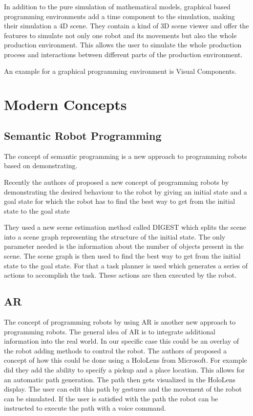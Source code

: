 \documentclass[conference]{IEEEtran}
\begin{document}

        In addition to the pure simulation of mathematical models, graphical based programming environments add a time component to the simulation, making their simulation a 4D scene.
        They contain a kind of 3D scene viewer and offer the features to simulate not only one robot and its movements but also the whole production environment. This allows the user to simulate the whole production process and interactions between different parts of the production environment. %

        An example for a graphical programming environment is Visual Components. %

\section{Modern Concepts}

    \subsection{Semantic Robot Programming}

        The concept of semantic programming is a new approach to programming robots based on demonstrating.

        Recently the authors of \cite{p1} proposed a new concept of programming robots by demonstrating the desired behaviour to the robot by giving an initial state and a goal state for which the robot has to find the best way to get from the initial state to the goal state

        They used a new scene estimation method called DIGEST which splits the scene into a scene graph representing the structure of the initial state. The only parameter needed is the information about the number of objects present in the scene. The scene graph is then used to find the best way to get from the initial state to the goal state.
        For that a task planner is used which generates a series of actions to accomplish the task. These actions are then executed by the robot.
        \cite[p. 2]{p1}

    \subsection{AR}
    
        The concept of programming robots by using AR is another new approach to programming robots.
        The general idea of AR is to integrate additional information into the real world. In our specific case this could be an overlay of the robot adding methods to control the robot.
        The authors of \cite{p3} proposed a concept of how this could be done using a HoloLens from Microsoft.
        For example did they add the ability to specify a pickup and a place location. This allows for an automatic path generation. The path then gets visualized in the HoloLens display. The user can edit this path by gestures and the movement of the robot can be simulated.
        If the user is satisfied with the path the robot can be instructed to execute the path with a voice command.
        \cite[p. 2]{p3}
\end{document}
